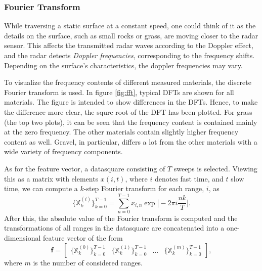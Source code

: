 



\subsubsection{Fourier Transform}
While traversing a static surface at a constant speed, one could think of it as the details on the surface, such as small rocks or grass, are moving closer to the radar sensor. This affects the transmitted radar waves according to the Doppler effect, and the radar detects \textit{Doppler frequencies}, corresponding to the frequency shifts. Depending on the surface's characteristics, the doppler frequencies may vary. 

To visualize the frequency contents of different measured materials, the discrete Fourier transform is used. In figure \ref{fig:fft}, typical DFTs are shown for all materials. The figure is intended to show differences in the DFTs. Hence, to make the difference more clear, the squre root of the DFT has been plotted. For grass (the top two plots), it can be seen that the frequency content is contained mainly at the zero frequency. The other materials contain slightly higher frequency content as well. Gravel, in particular, differs a lot from the other materials with a wide variety of frequency components.

As for the feature vector, a datasquare consisting of $T$ sweeps is selected. Viewing this as a matrix with elements $x(i,t)$, where $i$ denotes fast time, and $t$ slow time, we can compute a $k$-step Fourier transform for each range, $i$, as
\begin{equation}
	\{\mathbb{X}_k^{(i)}\}_{k=0}^{T-1} =  \sum_{n=0}^{T-1}x_{i,n}\exp\Big[-2\pi i\frac{nk}{T}\Big].
\end{equation}
After this, the absolute value of the Fourier transform is computed and the transformations of all ranges in the datasquare are concatenated into a one-dimensional feature vector of the form
\begin{equation}
	\textbf{f}=\begin{bmatrix} \{\mathbb{X}_k^{(0)}\}_{k=0}^{T-1} & \{\mathbb{X}_k^{(1)}\}_{k=0}^{T-1} & \hdots & \{\mathbb{X}_k^{(m)}\}_{k=0}^{T-1} \end{bmatrix},
\end{equation}
where $m$ is the number of considered ranges.


